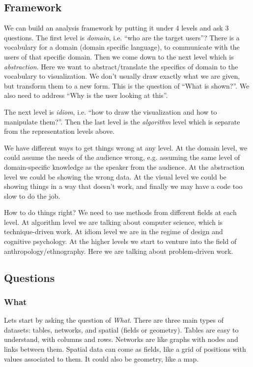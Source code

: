\documentclass[letterpaper, 11pt]{article}
\numberwithin{equation}{section}
\numberwithin{figure}{section}
\begin{document}
\subsection{Framework}

We can build an analysis framework by putting it under 4 levels and ask 3
questions. The first level is \emph{domain}, i.e. ``who are the target users''?
There is a vocabulary for a domain (domain specific language), to communicate
with the users of that specific domain. Then we come down to the next level
which is \emph{abstraction}. Here we want to abstract/translate the specifics of
domain to the vocabulary to visualization. We don't usually draw exactly what we
are given, but transform them to a new form. This is the question of ``What is
shown?''. We also need to address ``Why is the user looking at this''.

The next level is \emph{idiom}, i.e. ``how to draw the visualization and how to
manipulate them?''. Then the last level is the \emph{algorithm} level which is separate
from the representation levels above.

We have different ways to get things wrong at any level. At the domain level, we
could assume the needs of the audience wrong, e.g. assuming the same level of
domain-specific knowledge as the speaker from the audience. At the abstraction
level we could be showing the wrong data. At the visual level we could be
showing things in a way that doesn't work, and finally we may have a code too
slow to do the job.

How to do things right? We need to use methods from different fields at each
level. At algorithm level we are talking about computer science, which is
technique-driven work. At idiom level we are in the regime of design and
cognitive psychology. At the higher levels we start to venture into the
field of anthropology/ethnography. Here we are talking about problem-driven
work.

\subsection{Questions}

\subsubsection{What}

Lets start by asking the question of \emph{What}. There are three main types of
datasets: tables, networks, and spatial (fields or geometry). Tables are easy to
understand, with columns and rows. Networks are like graphs with nodes and links
between them. Spatial data can come as fields, like a grid of positions with
values associated to them. It could also be geometry, like a map.
\end{document}
